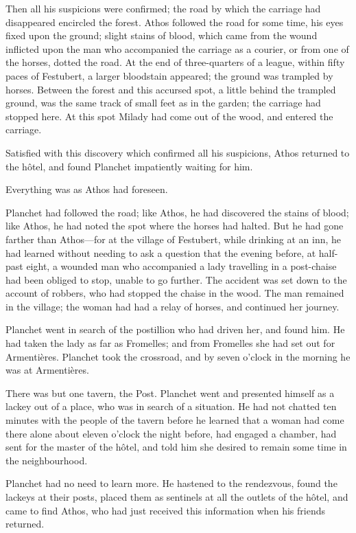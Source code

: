 Then all his suspicions were confirmed; the road by which the carriage had disappeared encircled the forest. Athos followed the road for some time, his eyes fixed upon the ground; slight stains of blood, which came from the wound inflicted upon the man who accompanied the carriage as a courier, or from one of the horses, dotted the road. At the end of three-quarters of a league, within fifty paces of Festubert, a larger bloodstain appeared; the ground was trampled by horses. Between the forest and this accursed spot, a little behind the trampled ground, was the same track of small feet as in the garden; the carriage had stopped here. At this spot Milady had come out of the wood, and entered the carriage. 

Satisfied with this discovery which confirmed all his suspicions, Athos returned to the hôtel, and found Planchet impatiently waiting for him. 

Everything was as Athos had foreseen. 

Planchet had followed the road; like Athos, he had discovered the stains of blood; like Athos, he had noted the spot where the horses had halted. But he had gone farther than Athos—for at the village of Festubert, while drinking at an inn, he had learned without needing to ask a question that the evening before, at half-past eight, a wounded man who accompanied a lady travelling in a post-chaise had been obliged to stop, unable to go further. The accident was set down to the account of robbers, who had stopped the chaise in the wood. The man remained in the village; the woman had had a relay of horses, and continued her journey. 

Planchet went in search of the postillion who had driven her, and found him. He had taken the lady as far as Fromelles; and from Fromelles she had set out for Armentières. Planchet took the crossroad, and by seven o'clock in the morning he was at Armentières. 

There was but one tavern, the Post. Planchet went and presented himself as a lackey out of a place, who was in search of a situation. He had not chatted ten minutes with the people of the tavern before he learned that a woman had come there alone about eleven o'clock the night before, had engaged a chamber, had sent for the master of the hôtel, and told him she desired to remain some time in the neighbourhood. 

Planchet had no need to learn more. He hastened to the rendezvous, found the lackeys at their posts, placed them as sentinels at all the outlets of the hôtel, and came to find Athos, who had just received this information when his friends returned. 

